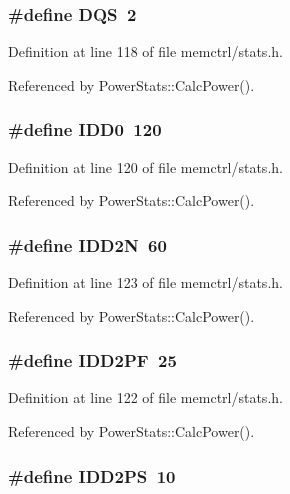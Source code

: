 \subsubsection[{DQS}]{\setlength{\rightskip}{0pt plus 5cm}\#define DQS~2}\label{memctrl_2stats_8h_2ed01491cb4167104350262d51906b9f}




Definition at line 118 of file memctrl/stats.h.

Referenced by PowerStats::CalcPower().
\subsubsection[{IDD0}]{\setlength{\rightskip}{0pt plus 5cm}\#define IDD0~120}\label{memctrl_2stats_8h_c5d55bab190c738b63e338bad3e3ca3a}




Definition at line 120 of file memctrl/stats.h.

Referenced by PowerStats::CalcPower().
\subsubsection[{IDD2N}]{\setlength{\rightskip}{0pt plus 5cm}\#define IDD2N~60}\label{memctrl_2stats_8h_a7065efe3389eee833eb071f3bf9bfac}




Definition at line 123 of file memctrl/stats.h.

Referenced by PowerStats::CalcPower().
\subsubsection[{IDD2PF}]{\setlength{\rightskip}{0pt plus 5cm}\#define IDD2PF~25}\label{memctrl_2stats_8h_43e6e95c5e875592749eb53405c821d0}




Definition at line 122 of file memctrl/stats.h.

Referenced by PowerStats::CalcPower().
\subsubsection[{IDD2PS}]{\setlength{\rightskip}{0pt plus 5cm}\#define IDD2PS~10}\label{memctrl_2stats_8h_726029c62317a151ec1046a2ddc48fcb}




